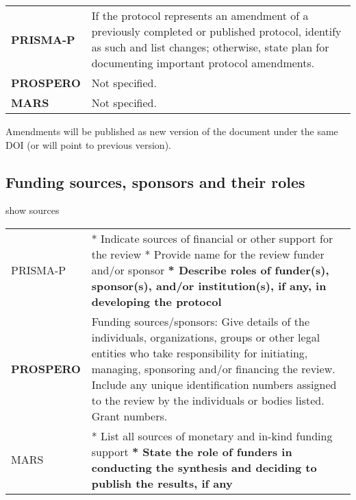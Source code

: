 \documentclass[
]{article}
\begin{document}
\hypertarget{atpv}{}
\begin{collapse}

\begin{table}[H]
\centering
\begin{tabular}{>{}l|l}
\hline
\cellcolor[HTML]{ececec}{source} & \cellcolor[HTML]{ececec}{description}\\
\hline
\textbf{PRISMA-P} & If the protocol represents an amendment of a previously completed or published protocol, identify as such and list changes; otherwise, state plan for documenting important protocol amendments.\\
\hline
\textbf{PROSPERO} & Not specified.\\
\hline
\textbf{MARS} & Not specified.\\
\hline
\end{tabular}
\end{table}

\end{collapse}

Amendments will be published as new version of the document under the
same DOI (or will point to previous version).

\hypertarget{funding-sources-sponsors-and-their-roles}{%
\subsection{Funding sources, sponsors and their
roles}\label{funding-sources-sponsors-and-their-roles}}

show sources

\hypertarget{fsign}{}
\begin{collapse}

\begin{table}[H]
\centering
\begin{tabular}{>{}l|l}
\hline
\cellcolor[HTML]{ececec}{source} & \cellcolor[HTML]{ececec}{description}\\
\hline
PRISMA-P & * Indicate sources of financial or other support for the review
* Provide name for the review funder and/or sponsor
\textbf{* Describe roles of funder(s), sponsor(s), and/or institution(s), if any, in developing the protocol}\\
\hline
\textbf{PROSPERO} & Funding sources/sponsors: Give details of the individuals, organizations, groups or other legal entities who take responsibility for initiating, managing, sponsoring and/or financing the review. Include any unique identification numbers assigned to the review by the individuals or bodies listed. Grant numbers.\\
\hline
MARS & * List all sources of monetary and in-kind funding support
\textbf{* State the role of funders in conducting the synthesis and deciding to publish the results, if any}\\
\hline
\end{tabular}
\end{table}

\end{collapse}
\end{document}
